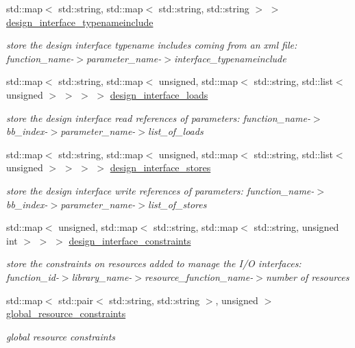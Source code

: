 \begin{DoxyCompactItemize}
std\+::map$<$ std\+::string, std\+::map$<$ std\+::string, std\+::string $>$ $>$ \hyperlink{classHLS__manager_a1b6155e191406f48cb6acb62f1b7452a}{design\+\_\+interface\+\_\+typenameinclude}
\begin{DoxyCompactList}\small\item\em store the design interface typename includes coming from an xml file\+: function\+\_\+name-\/$>$parameter\+\_\+name-\/$>$interface\+\_\+typenameinclude \end{DoxyCompactList}\item 
std\+::map$<$ std\+::string, std\+::map$<$ unsigned, std\+::map$<$ std\+::string, std\+::list$<$ unsigned $>$ $>$ $>$ $>$ \hyperlink{classHLS__manager_a17a38a245c68dd49cc486c7b63863d9c}{design\+\_\+interface\+\_\+loads}
\begin{DoxyCompactList}\small\item\em store the design interface read references of parameters\+: function\+\_\+name-\/$>$bb\+\_\+index-\/$>$parameter\+\_\+name-\/$>$list\+\_\+of\+\_\+loads \end{DoxyCompactList}\item 
std\+::map$<$ std\+::string, std\+::map$<$ unsigned, std\+::map$<$ std\+::string, std\+::list$<$ unsigned $>$ $>$ $>$ $>$ \hyperlink{classHLS__manager_a0fa12a49e2a498dfd7cd08a581e3727d}{design\+\_\+interface\+\_\+stores}
\begin{DoxyCompactList}\small\item\em store the design interface write references of parameters\+: function\+\_\+name-\/$>$bb\+\_\+index-\/$>$parameter\+\_\+name-\/$>$list\+\_\+of\+\_\+stores \end{DoxyCompactList}\item 
std\+::map$<$ unsigned, std\+::map$<$ std\+::string, std\+::map$<$ std\+::string, unsigned int $>$ $>$ $>$ \hyperlink{classHLS__manager_af8513cdb4d4acde603c9c9a84b42c19f}{design\+\_\+interface\+\_\+constraints}
\begin{DoxyCompactList}\small\item\em store the constraints on resources added to manage the I/O interfaces\+: function\+\_\+id-\/$>$library\+\_\+name-\/$>$resource\+\_\+function\+\_\+name-\/$>$number of resources \end{DoxyCompactList}\item 
std\+::map$<$ std\+::pair$<$ std\+::string, std\+::string $>$, unsigned $>$ \hyperlink{classHLS__manager_a72db23fe6f872fbbb85ca81ec4468c0d}{global\+\_\+resource\+\_\+constraints}
\begin{DoxyCompactList}\small\item\em global resource constraints \end{DoxyCompactList}\end{DoxyCompactItemize}
